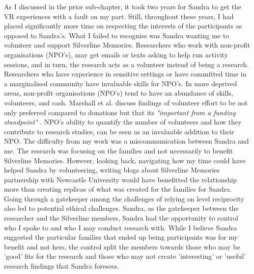 As I discussed in the prior sub-chapter, it took two years for Sandra to get the VR experiences with a fault on my part. Still, throughout these years, I had placed significantly more time on respecting the interests of the participants as opposed to Sandra's. What I failed to recognise was Sandra wanting me to volunteer and support Silverline Memories. Researchers who work with non-profit organisations (NPO's), may get emails or texts asking to help run activity sessions, and in turn, the research acts as a volunteer instead of being a research. Researchers who have experience in sensitive settings or have committed time in a marginalised community have invaluable skills for NPO's.  In more deprived areas, non-profit organisations (NPO's) tend to have an abundance of skills, volunteers, and cash. Marshall et al. discuss findings of volunteer effort to be not only preferred compared to donations but that its \textit{"important from a funding standpoint"} \citep{marshall_accountable_2016}. NPO's ability to quantify the number of volunteers and how they contribute to research studies, can be seen as an invaluable addition to their NPO. The difficulty from my work was a miscommunication between Sandra and me. The research was focusing on the families and not necessarily to benefit Silverline Memories. However, looking back, navigating how my time could have helped Sandra by volunteering, writing blogs about Silverline Memories partnership with Newcastle University would have benefitted the relationship more than creating replicas of what was created for the families for Sandra. Going through a gatekeeper among the challenges of relying on level reciprocity also led to potential ethical challenges. Sandra, as the gatekeeper between the researcher and the Silverline members, Sandra had the opportunity to control who I spoke to and who I may conduct research with. While I believe Sandra suggested the particular families that ended up being participants was for my benefit and not hers, the control split the members towards those who may be 'good' fits for the research and those who may not create 'interesting' or 'useful' research findings that Sandra foresees.  

